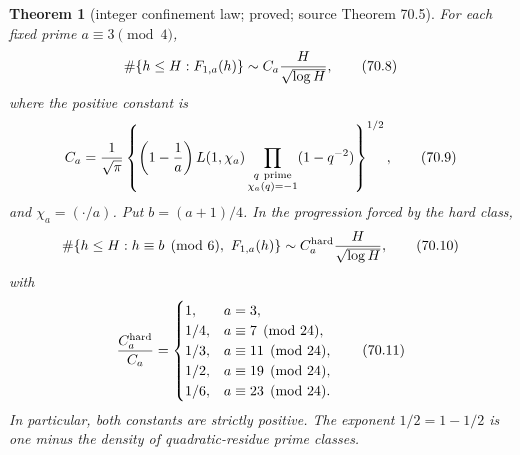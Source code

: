 \documentclass[10pt,reqno]{amsart}
\newtheorem{theorem}{Theorem}[section]
\theoremstyle{definition}
\newcommand{\1}{\mathbf 1}
\begin{document}
\begin{theorem}[integer confinement law; proved; source Theorem 70.5]\label{thm:integer-confinement}  For each fixed prime
$a\equiv3\pmod4$,
\begin{equation}
 \#\{h\leq H:F_{1,a}(h)\}
       \sim C_a{H\over\sqrt{\log H}},                      \tag{70.8}
\end{equation}
where the positive constant is
\begin{equation}
 C_a={1\over\sqrt\pi}
 \left\{\left(1-{1\over a}\right)L(1,\chi_a)
       \prod_{\substack{q\ {\rm prime}\\\chi_a(q)=-1}}
                    (1-q^{-2})\right\}^{1/2},             \tag{70.9}
\end{equation}
and $\chi_a=(\cdot/a)$.  Put $b=(a+1)/4$.  In the progression forced
by the hard class,
\begin{equation}
 \#\{h\leq H:h\equiv b\pmod6,\ F_{1,a}(h)\}
       \sim C_a^{\rm hard}{H\over\sqrt{\log H}},           \tag{70.10}
\end{equation}
with
\begin{equation}
 {C_a^{\rm hard}\over C_a}=
 \begin{cases}
 1,&a=3,\\
 1/4,&a\equiv7\pmod {24},\\
 1/3,&a\equiv11\pmod {24},\\
 1/2,&a\equiv19\pmod {24},\\
 1/6,&a\equiv23\pmod {24}.
 \end{cases}                                               \tag{70.11}
\end{equation}
In particular, both constants are strictly positive.  The exponent
$1/2=1-1/2$ is one minus the density of quadratic-residue prime classes.

\end{theorem}
\end{document}
